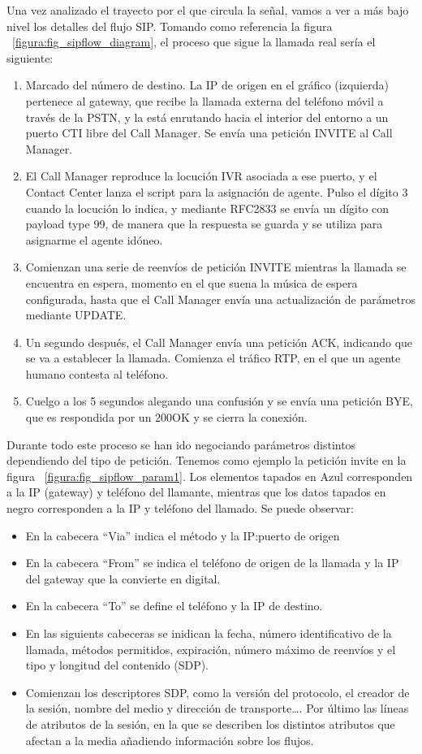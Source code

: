 \documentclass[a4paper, 12pt]{book}
\begin{document}
Una vez analizado el trayecto por el que circula la señal, vamos a ver a más bajo nivel los detalles del flujo SIP. Tomando como referencia la figura ~\ref{figura:fig_sipflow_diagram}, el proceso que sigue la llamada real sería el siguiente:
\begin{enumerate}
  \item Marcado del número de destino. La IP de origen en el gráfico (izquierda) pertenece al gateway, que recibe la llamada externa del teléfono móvil a través de la PSTN, y la está enrutando hacia el interior del entorno a un puerto CTI libre del Call Manager. Se envía una petición INVITE al Call Manager.
  \item El Call Manager reproduce la locución IVR asociada a ese puerto, y el Contact Center lanza el script para la asignación de agente. Pulso el dígito 3 cuando la locución lo indica, y mediante RFC2833 se envía un dígito con payload type 99, de manera que la respuesta se guarda y se utiliza para asignarme el agente idóneo.
  \item Comienzan una serie de reenvíos de petición INVITE mientras la llamada se encuentra en espera, momento en el que suena la música de espera configurada, hasta que el Call Manager envía una actualización de parámetros mediante UPDATE. 
  \item Un segundo después, el Call Manager envía una petición ACK, indicando que se va a establecer la llamada. Comienza el tráfico RTP, en el que un agente humano contesta al teléfono. 
  \item Cuelgo a los 5 segundos alegando una confusión y se envía una petición BYE, que es respondida por un 200OK y se cierra la conexión.
\end{enumerate}
Durante todo este proceso se han ido negociando parámetros distintos dependiendo del tipo de petición. Tenemos como ejemplo la petición invite en la figura ~\ref{figura:fig_sipflow_param1}. Los elementos tapados en Azul corresponden a la IP (gateway) y teléfono del llamante, mientras que los datos tapados en negro corresponden a la IP y teléfono del llamado. Se puede observar:
\begin{itemize}
  \item En la cabecera ``Via'' indica el método y la IP:puerto de origen
  \item En la cabecera ``From'' se indica el teléfono de origen de la llamada y la IP del gateway que la convierte en digital.
  \item En la cabecera ``To'' se define el teléfono y la IP de destino.
  \item En las siguients cabeceras se inidican la fecha, número identificativo de la llamada, métodos permitidos, expiración, número máximo de reenvíos y el tipo y longitud del contenido (SDP).
  \item Comienzan los descriptores SDP, como la versión del protocolo, el creador de la sesión, nombre del medio y dirección de transporte\ldots. Por último las líneas de atributos de la sesión, en la que se describen los distintos atributos que afectan a la media añadiendo información sobre los flujos.
\end{itemize}
\end{document}
